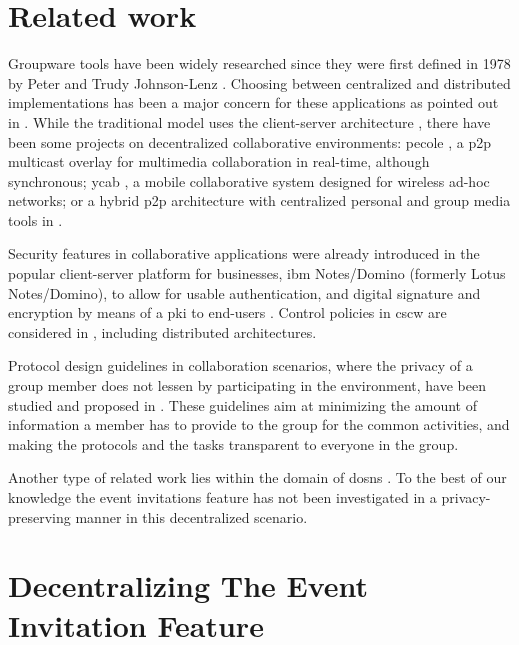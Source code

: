 \section{Related work}
	\label{section:event-invitations-dosns:related-work}
Groupware tools have been widely researched since they were first defined in 1978 
by Peter and Trudy Johnson-Lenz \cite{JohnsonLenz98}. 
%
Choosing between centralized and distributed implementations has been a major concern 
for these applications as pointed out in \cite{ReinhardSVW94}. While the traditional
model uses the client-server architecture \cite{TrevorKW97,LiOFWLN04}, there have 
been some projects on decentralized collaborative environments: \Acl{pecole} \cite{El-SaddikRAS08}, 
a \acs*{p2p} multicast overlay for multimedia collaboration in real-time, although 
synchronous; \acs*{ycab} \cite{BuszkoLH01}, a mobile collaborative system designed 
for wireless ad-hoc networks; or a hybrid \acs*{p2p} architecture with centralized 
personal and group media tools in \cite{ZhangJ06}.

Security features in collaborative applications were already introduced in the popular 
client-server platform for businesses, \acs*{ibm} Notes/Domino (formerly Lotus Notes/Domino), 
to allow for usable authentication, and digital signature and encryption by means 
of a \Ac{pki} to end-users \cite{Zurko05}. Control policies in \Ac{cscw} are considered 
in \cite{RoddenB91}, including distributed architectures.

Protocol design guidelines in collaboration scenarios, where the privacy 
of a group member does not lessen by participating in the 
environment, have been studied and proposed in \cite{KimK06a}. These guidelines aim 
at minimizing the amount of information a member has to provide to the group for 
the common activities, and making the protocols and 
the tasks transparent to everyone in the group.

Another type of related work lies within the domain of \Acp{dosn} \cite{BadenBSBS09,CutilloMS09,FamulariH12}. To the best of 
our knowledge the event invitations feature has not been investigated in a privacy-preserving 
manner in this decentralized scenario.

\section{Decentralizing The Event Invitation Feature}
	\label{section:event-invitations-dosns:decentralizing-the-event-invitation-feature}

